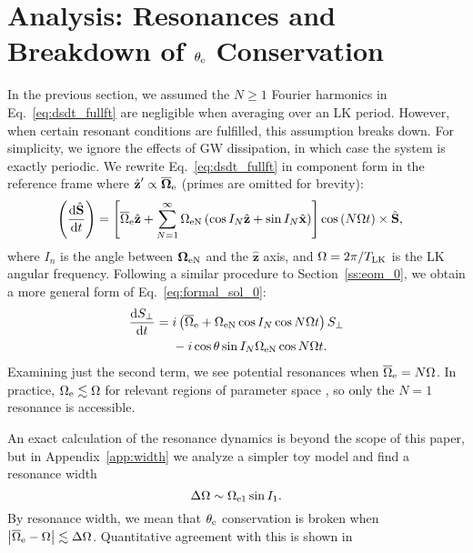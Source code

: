 \documentclass[
        fleqn,
        usenatbib,
    ]{mnras}
\newcommand*{\rd}[2]{\frac{\mathrm{d}#1}{\mathrm{d}#2}}
\newcommand*{\abs}[1]{\left|#1\right|}
\newcommand*{\bm}[1]{\boldsymbol{\mathbf{#1}}}
\newcommand*{\uv}[1]{\hat{\bm{#1}}}
\newcommand*{\p}[1]{\left(#1\right)}
\newcommand*{\s}[1]{\left[#1\right]}
\begin{document}
\section{Analysis: Resonances and Breakdown of $\theta_{\rm e}$ Conservation}

In the previous section, we assumed the $N \geq 1$ Fourier harmonics in
Eq.~\eqref{eq:dsdt_fullft} are negligible when averaging over an LK period.
However, when certain resonant conditions are fulfilled, this assumption breaks
down. For simplicity, we ignore the effects of GW dissipation, in which case the
system is exactly periodic. We rewrite Eq.~\eqref{eq:dsdt_fullft} in component
form in the reference frame where $\uv{z}' \propto \bm{\overline{\Omega}}_{\rm
e}$ (primes are omitted for brevity):
\begin{align}
    \p{\rd{\uv{S}}{t}}
        &= \s{\overline{\Omega}_{\rm e}\uv{z}
            + \sum\limits_{N = 1}^\infty
            \Omega_{\rm e N}\p{\cos I_N \uv{z} + \sin I_N \uv{x}}} \cos
            \p{N\Omega t}
            \times \uv{S},
\end{align}
where $I_n$ is the angle between $\bm{\Omega}_{\rm e N}$ and the $\uv{z}$
axis, and $\Omega = 2\pi / T_{\rm LK}$ is the LK angular frequency. Following a
similar procedure to Section~\ref{ss:eom_0}, we obtain a more general form of
Eq.~\eqref{eq:formal_sol_0}:
\begin{align}
    \rd{S_{\perp}}{t} ={}& i\p{\overline{\Omega}_{\rm e} + \Omega_{\rm eN}
        \cos I_N\cos N \Omega t} S_\perp\nonumber\\
        &- i\cos \theta \sin I_N \Omega_{\rm eN} \cos N\Omega t.
\end{align}
Examining just the second term, we see potential resonances when
$\overline{\Omega}_{\rm e} = N\Omega$. In practice, $\Omega_{\rm e} \lesssim
\Omega$ for relevant regions of parameter space
, so only the $N = 1$ resonance is accessible.

An exact calculation of the resonance dynamics is beyond the scope of this
paper, but in Appendix~\ref{app:width} we analyze a simpler toy model and find
a resonance width
\begin{equation}
    \Delta \Omega \sim \Omega_{\rm e1}\sin I_1.\label{eq:width}
\end{equation}
By resonance width, we mean that $\theta_{\rm e}$ conservation is broken when
$\abs{\overline{\Omega}_{\rm e} - \Omega} \lesssim \Delta \Omega$. Quantitative
agreement with this is shown in %
\end{document}
